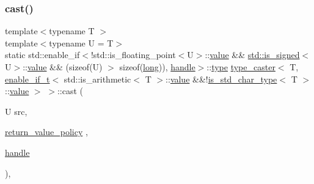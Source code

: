 \mbox{\label{structtype__caster_3_01_t_00_01enable__if__t_3_01std_1_1is__arithmetic_3_01_t_01_4_1_1value_01_624f9972c532456d927e4470192416960_aec21fe71fca08abe516b81e88bfd91cf}} 
\subsubsection{\texorpdfstring{cast()}{cast()}\hspace{0.1cm}{\footnotesize\ttfamily [4/5]}}
{\footnotesize\ttfamily template$<$typename T $>$ \\
template$<$typename U  = T$>$ \\
static std\+::enable\+\_\+if$<$!std\+::is\+\_\+floating\+\_\+point$<$U$>$\+::\mbox{\hyperlink{_s_d_l__opengl__glext_8h_a8ad81492d410ff2ac11f754f4042150f}{value}} \&\& \mbox{\hyperlink{longobject_8h_ad9d9c8fff108a941e143d34a86eb36a2}{std\+::is\+\_\+signed}}$<$U$>$\+::\mbox{\hyperlink{_s_d_l__opengl__glext_8h_a8ad81492d410ff2ac11f754f4042150f}{value}} \&\& (sizeof(U) $>$ sizeof(\mbox{\hyperlink{modsupport_8h_a0cb68e00fb9fb1260ee2daadd9fe6611}{long}})), \mbox{\hyperlink{classhandle}{handle}}$>$\+::\mbox{\hyperlink{_s_d_l__opengl_8h_ad5ddf6fca7b585646515660e810e0188}{type}} \mbox{\hyperlink{classtype__caster}{type\+\_\+caster}}$<$ T, \mbox{\hyperlink{detail_2common_8h_a012819c9e8b5e04872a271f50f8b8196}{enable\+\_\+if\+\_\+t}}$<$ std\+::is\+\_\+arithmetic$<$ T $>$\+::\mbox{\hyperlink{_s_d_l__opengl__glext_8h_a8ad81492d410ff2ac11f754f4042150f}{value}} \&\&!\mbox{\hyperlink{cast_8h_a0ee0eaf3d12f9b0e472ed620777ba3c3}{is\+\_\+std\+\_\+char\+\_\+type}}$<$ T $>$\+::\mbox{\hyperlink{_s_d_l__opengl__glext_8h_a8ad81492d410ff2ac11f754f4042150f}{value}} $>$ $>$\+::cast (\begin{DoxyParamCaption}\item[{U}]{src,  }\item[{\mbox{\hyperlink{detail_2common_8h_adde72ab1fb0dd4b48a5232c349a53841}{return\+\_\+value\+\_\+policy}}}]{,  }\item[{\mbox{\hyperlink{classhandle}{handle}}}]{ }\end{DoxyParamCaption})\hspace{0.3cm}{\ttfamily [inline]}, {\ttfamily [static]}}

